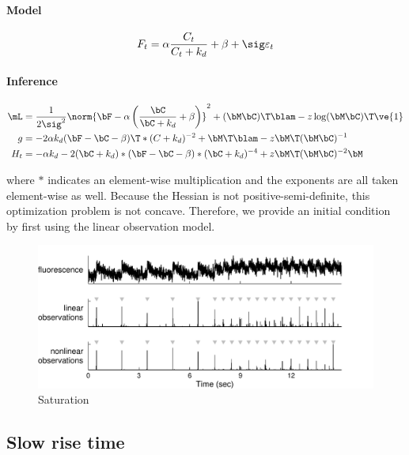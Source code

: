 \paragraph{Model}

\begin{align}
	F_t = \alpha \frac{C_t}{C_t + k_d} + \beta + \sig \varepsilon_t
\end{align}

\paragraph{Inference}

\begin{subequations} 
\begin{align}
\mL &= \frac{1}{2\sig^2} \norm{\bF - \alpha\left( \frac{\bC}{\bC+k_d} + \beta\right)}^2 + (\bM \bC)\T \blam - z \log (\bM\bC)\T \ve{1}  \\
g &= -2 \alpha k_d (\bF - \bC - \beta)\T  \ast (C+k_d)^{-2} + \bM\T\blam - z \bM\T (\bM\bC)^{-1} \\
H_{t} &= -\alpha k_d - 2(\bC + k_d) \ast (\bF-\bC-\beta) \ast (\bC + k_d)^{-4} + z \bM\T (\bM \bC)^{-2} \bM
\end{align}
\end{subequations}

\noindent where $\ast$ indicates an element-wise multiplication and the exponents are all taken element-wise as well. Because the Hessian is not positive-semi-definite, this optimization problem is not concave.  Therefore, we provide an initial condition by first using the linear observation model.  

\begin{figure}[h!]
\centering \includegraphics[width=.9\linewidth]{../figs/nonlin}
\caption{Saturation} \label{fig:satur}
\end{figure}

\subsection{Slow rise time}

